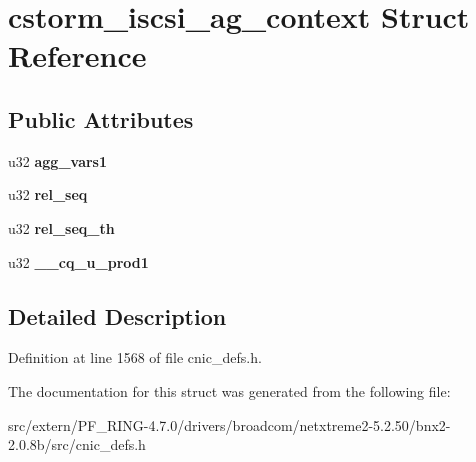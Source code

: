 \hypertarget{structcstorm__iscsi__ag__context}{
\section{cstorm\_\-iscsi\_\-ag\_\-context Struct Reference}
\label{structcstorm__iscsi__ag__context}
}
\subsection*{Public Attributes}
\begin{DoxyCompactItemize}
\item 
\hypertarget{structcstorm__iscsi__ag__context_a11ab940ad99e81e9b97b404e71b8b20b}{
u32 {\bfseries agg\_\-vars1}}
\label{structcstorm__iscsi__ag__context_a11ab940ad99e81e9b97b404e71b8b20b}

\item 
\hypertarget{structcstorm__iscsi__ag__context_a735f96c6ee12e8eb90c1e8685eb50ac8}{
u32 {\bfseries rel\_\-seq}}
\label{structcstorm__iscsi__ag__context_a735f96c6ee12e8eb90c1e8685eb50ac8}

\item 
\hypertarget{structcstorm__iscsi__ag__context_aa4762fe698afa4a7f444d535c8f3d5c2}{
u32 {\bfseries rel\_\-seq\_\-th}}
\label{structcstorm__iscsi__ag__context_aa4762fe698afa4a7f444d535c8f3d5c2}

\item 
\hypertarget{structcstorm__iscsi__ag__context_a7d0488c345babfc1c29745009aa611ec}{
u32 {\bfseries \_\-\_\-cq\_\-u\_\-prod1}}
\label{structcstorm__iscsi__ag__context_a7d0488c345babfc1c29745009aa611ec}

\end{DoxyCompactItemize}


\subsection{Detailed Description}


Definition at line 1568 of file cnic\_\-defs.h.



The documentation for this struct was generated from the following file:\begin{DoxyCompactItemize}
\item 
src/extern/PF\_\-RING-\/4.7.0/drivers/broadcom/netxtreme2-\/5.2.50/bnx2-\/2.0.8b/src/cnic\_\-defs.h\end{DoxyCompactItemize}
